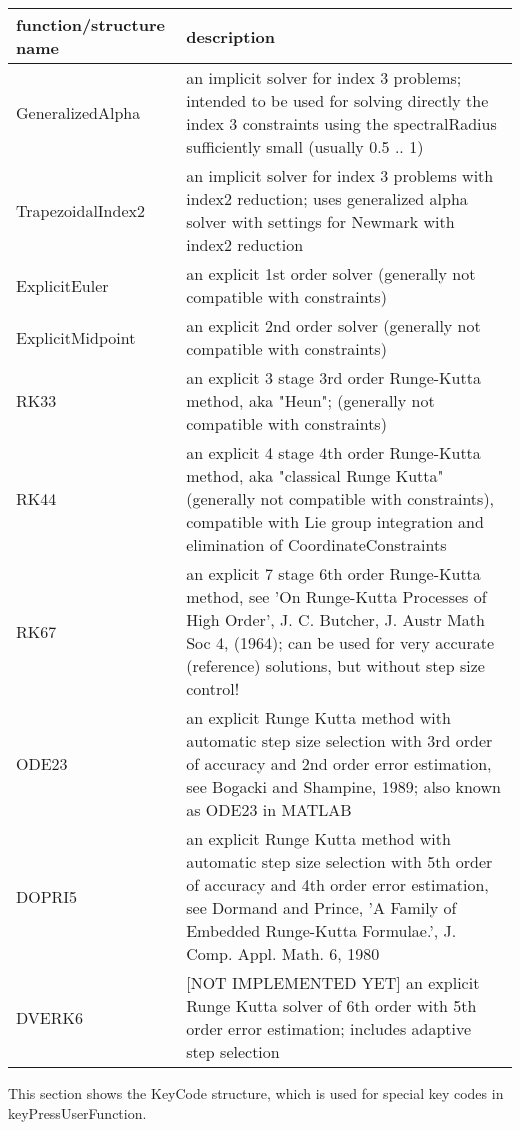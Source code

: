 \begin{center}
\footnotesize
\begin{longtable}{| p{8cm} | p{8cm} |} 
\hline
{\bf function/structure name} & {\bf description}\\ \hline
  GeneralizedAlpha & an implicit solver for index 3 problems; intended to be used for solving directly the index 3 constraints using the spectralRadius sufficiently small (usually 0.5 .. 1)\\ \hline 
  TrapezoidalIndex2 & an implicit solver for index 3 problems with index2 reduction; uses generalized alpha solver with settings for Newmark with index2 reduction\\ \hline 
  ExplicitEuler & an explicit 1st order solver (generally not compatible with constraints)\\ \hline 
  ExplicitMidpoint & an explicit 2nd order solver (generally not compatible with constraints)\\ \hline 
  RK33 & an explicit 3 stage 3rd order Runge-Kutta method, aka "Heun"; (generally not compatible with constraints)\\ \hline 
  RK44 & an explicit 4 stage 4th order Runge-Kutta method, aka "classical Runge Kutta" (generally not compatible with constraints), compatible with Lie group integration and elimination of CoordinateConstraints\\ \hline 
  RK67 & an explicit 7 stage 6th order Runge-Kutta method, see 'On Runge-Kutta Processes of High Order', J. C. Butcher, J. Austr Math Soc 4, (1964); can be used for very accurate (reference) solutions, but without step size control!\\ \hline 
  ODE23 & an explicit Runge Kutta method with automatic step size selection with 3rd order of accuracy and 2nd order error estimation, see Bogacki and Shampine, 1989; also known as ODE23 in MATLAB\\ \hline 
  DOPRI5 & an explicit Runge Kutta method with automatic step size selection with 5th order of accuracy and 4th order error estimation, see  Dormand and Prince, 'A Family of Embedded Runge-Kutta Formulae.', J. Comp. Appl. Math. 6, 1980\\ \hline 
  DVERK6 & [NOT IMPLEMENTED YET] an explicit Runge Kutta solver of 6th order with 5th order error estimation; includes adaptive step selection\\ \hline 
\end{longtable}
\end{center}

\label{sec:KeyCode}
This section shows the KeyCode structure, which is used for special key codes in keyPressUserFunction.



